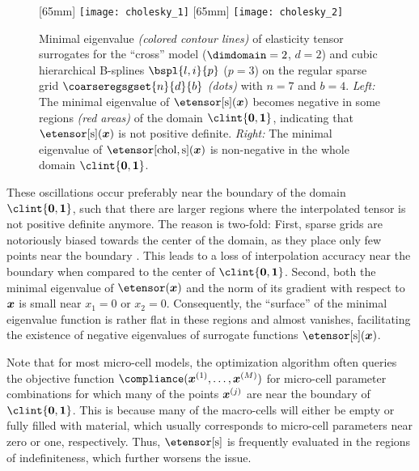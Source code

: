 \begin{figure}
  [65mm]{%
    \texttt{[image: cholesky\_1]}%
  }%
  \hfill%
  [65mm]{%
    \texttt{[image: cholesky\_2]}%
  }%
  \hfill\hfill%
  \caption[%
    Minimal eigenvalue of interpolated elasticity tensors%
  ]{%
    Minimal eigenvalue \emph{(colored contour lines)}
    of elasticity tensor surrogates
    for the ``cross'' model ($\dimdomain = 2$, $d = 2$)
    and cubic hierarchical B-splines $\bspl{l,i}{p}$ ($p = 3$) on
    the regular sparse grid $\coarseregsgset{n}{d}{b}$ \emph{(dots)}
    with $n = 7$ and $b = 4$.
    \emph{Left:} The minimal eigenvalue of $\etensor[\sparse](\*x)$
    becomes negative in some regions \emph{\textcolor{C1}{(red areas)}}
    of the domain $\clint{\*0, \*1}$,
    indicating that $\etensor[\sparse](\*x)$ is not positive definite.
    \emph{Right:} The minimal eigenvalue of $\etensor[\chol,\sparse](\*x)$
    is non-negative in the whole domain $\clint{\*0, \*1}$.%
  }%
  \label{fig:cholesky}%
\end{figure}

These oscillations occur preferably near the boundary of the domain
$\clint{\*0, \*1}$, such that there are larger regions
where the interpolated tensor is not positive definite anymore.
The reason is two-fold:
First, sparse grids are notoriously biased towards the center of the domain,
as they place only few points near the boundary \cite{Pflueger10Spatially}.
This leads to a loss of interpolation accuracy near the boundary
when compared to the center of $\clint{\*0, \*1}$.
Second, both the minimal eigenvalue of $\etensor(\*x)$ and the norm of its
gradient with respect to ${\boldsymbol{x}}$ is small near $x_1 = 0$ or $x_2 = 0$.
Consequently, the ``surface'' of the minimal eigenvalue function
is rather flat in these regions and almost vanishes,
facilitating the existence of negative eigenvalues of
surrogate functions $\etensor[\sparse](\*x)$.

Note that for most micro-cell models,
the optimization algorithm often queries the objective function
$\compliance(\*x^{(1)}, \dotsc, \*x^{(M)})$ for micro-cell parameter
combinations for which many of the points ${\boldsymbol{x}}^{(j)}$ are near the boundary
of $\clint{\*0, \*1}$.
This is because many of the macro-cells will either be empty or
fully filled with material, which usually corresponds to micro-cell
parameters near zero or one, respectively.
Thus, $\etensor[\sparse]$ is frequently evaluated in the regions of
indefiniteness, which further worsens the issue.

